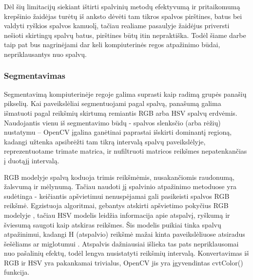\documentclass{VUMIFPSbakalaurinis}
\begin{document}
Dėl šių limitacijų siekiant ištirti spalvinių metodų efektyvumą ir pritaikomumą krepšinio žaidėjas turėtų iš anksto dėvėti tam tikros spalvos pirštines, batus bei valdyti ryškios spalvos kamuolį, tačiau realiame pasaulyje žaidėjus priversti nešioti skirtingų spalvų batus, pirštines būtų itin nepraktiška. Todėl šiame darbe taip pat bus nagrinėjami dar keli kompiuterinės regos atpažinimo būdai, nepriklausantys nuo spalvų. 

\subsubsection{Segmentavimas}
Segmentavimą kompiuterinėje regoje galima suprasti kaip radimą grupės panašių pikselių. Kai paveikslėliai segmentuojami pagal spalvą, panašumą galima išmatuoti pagal reikšmių skirtumą remiantis RGB arba HSV spalvų erdvėmis. Naudojantis vienu iš segmentavimo būdų - spalvos slenksčio (arba rėžių) nustatymu – OpenCV įgalina ganėtinai paprastai išskirti dominantį regioną, kadangi užtenka apsibrėžti tam tikrą intervalą spalvų paveikslėlyje, reprezentuotame trimate matrica, ir nufiltruoti matricos reikšmes nepatenkančias į duotąjį intervalą. 

RGB modelyje spalvą koduoja trimis reikšmėmis, nusakančiomis raudonumą, žalsvumą ir mėlynumą. Tačiau naudoti jį spalvinio atpažinimo metoduose yra sudėtinga - keičiantis apšvietimui nenuspėjamai gali pasikeisti spalvos RGB reikšmė. Egzistuoja algoritmai, gebantys atskirti apšvietimo pokyčius RGB modelyje \cite{1220504}, tačiau HSV modelis leidžia informacija apie atspalvį, ryškumą ir šviesumą saugoti kaip atskiras reikšmes. Šis modelis puikiai tinka spalvų atpažinimui, kadangi H (atspalvio) reikšmė mažai kinta paveikslėliuose atsiradus šešėliams \cite{1039893} ar miglotumui \cite{7457892}. Atspalvis dažniausiai išlieka tas pats nepriklausomai nuo pašalinių efektų, todėl lengva nusistatyti reikšmių intervalą. Konvertavimas iš RGB ir HSV yra pakankamai trivialus, OpenCV jis yra įgyvendintas cvtColor() funkcija. 
\end{document}
